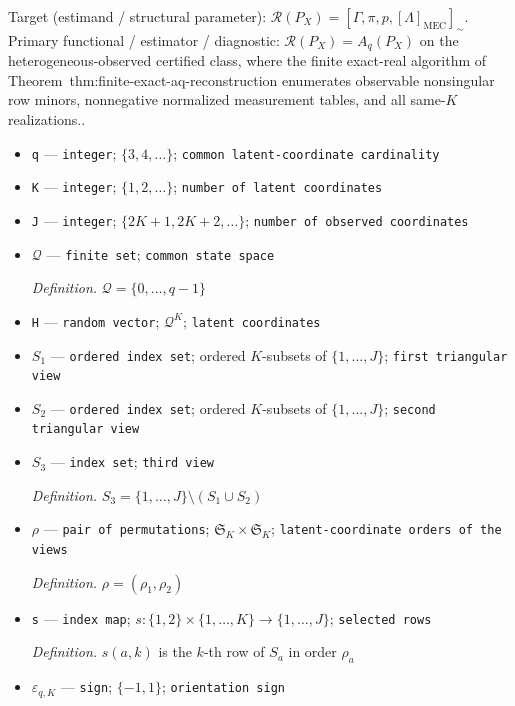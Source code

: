 \documentclass{article}
\begin{document}
Target (estimand / structural parameter): \(\mathcal R(P_X)=[\Gamma,\pi,p,[\Lambda]_{\mathrm{MEC}}]_{\sim}\).
Primary functional / estimator / diagnostic: \(\mathcal R(P_X)=A_q(P_X)\) on the heterogeneous-observed certified class, where the finite exact-real algorithm of Theorem~\textnormal{thm:finite-exact-aq-reconstruction} enumerates observable nonsingular row minors, nonnegative normalized measurement tables, and all same-\(K\) realizations..
\begin{itemize}
  \item \texttt{q} --- \texttt{integer}; \(\{3,4,\ldots\}\); \texttt{common latent-\allowbreak{}coordinate cardinality}
  \item \texttt{K} --- \texttt{integer}; \(\{1,2,\ldots\}\); \texttt{number of latent coordinates}
  \item \texttt{J} --- \texttt{integer}; \(\{2K+1,2K+2,\ldots\}\); \texttt{number of observed coordinates}
  \item \(\mathcal Q\) --- \texttt{finite set}; \texttt{common state space}
  \par\smallskip\noindent\emph{Definition.} \(\mathcal Q=\{0,\ldots,q-1\}\)
  \item \texttt{H} --- \texttt{random vector}; \(\mathcal Q^K\); \texttt{latent coordinates}
  \item \(S_1\) --- \texttt{ordered index set}; ordered \(K\)-subsets of \(\{1,\ldots,J\}\); \texttt{first triangular view}
  \item \(S_2\) --- \texttt{ordered index set}; ordered \(K\)-subsets of \(\{1,\ldots,J\}\); \texttt{second triangular view}
  \item \(S_3\) --- \texttt{index set}; \texttt{third view}
  \par\smallskip\noindent\emph{Definition.} \(S_3=\{1,\ldots,J\}\setminus(S_1\cup S_2)\)
  \item \(\rho\) --- \texttt{pair of permutations}; \(\mathfrak S_K\times\mathfrak S_K\); \texttt{latent-\allowbreak{}coordinate orders of the views}
  \par\smallskip\noindent\emph{Definition.} \(\rho=(\rho_1,\rho_2)\)
  \item \texttt{s} --- \texttt{index map}; \(s:\{1,2\}\times\{1,\ldots,K\}\to\{1,\ldots,J\}\); \texttt{selected rows}
  \par\smallskip\noindent\emph{Definition.} \(s(a,k)\) is the \(k\)-th row of \(S_a\) in order \(\rho_a\)
  \item \(\varepsilon_{q,K}\) --- \texttt{sign}; \(\{-1,1\}\); \texttt{orientation sign}

\end{itemize}
\end{document}
